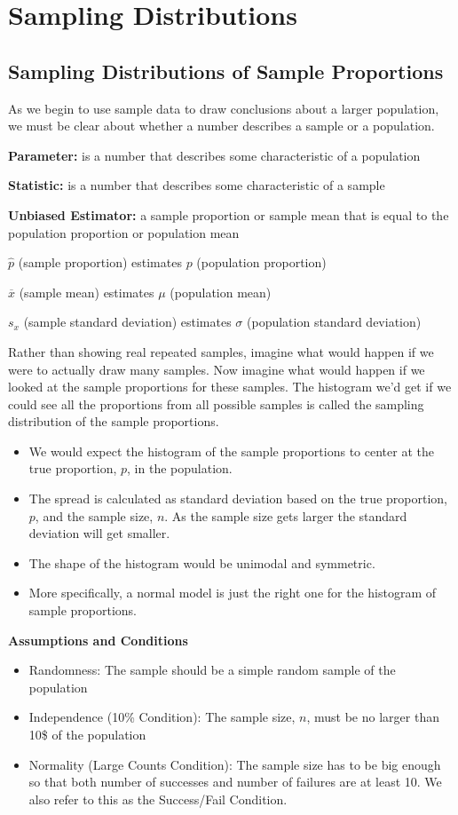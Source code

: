 \documentclass[../stats.tex]{subfiles}
\begin{document}
\chapter{Sampling Distributions}
\section{Sampling Distributions of Sample Proportions}
As we begin to use sample data to draw conclusions about a larger population, we must be clear about whether a number describes a sample or a population.

\textbf{Parameter: } is a number that describes some characteristic of a population 

\textbf{Statistic: } is a number that describes some characteristic of a sample 

\textbf{Unbiased Estimator: } a sample proportion or sample mean that is equal to the population proportion or population mean 

$\hat{p}$ (sample proportion) estimates $p$ (population proportion)

$\overline{x}$ (sample mean) estimates $\mu$ (population mean)

$s_x$ (sample standard deviation) estimates $\sigma$ (population standard deviation)

Rather than showing real repeated samples, imagine what would happen if we were to actually draw many samples. Now imagine what would happen if 
we looked at the sample proportions for these samples. The histogram we'd get if we could see all the proportions from all possible samples is called the 
sampling distribution of the sample proportions.
\begin{itemize}
    \item We would expect the histogram of the sample proportions to center at the true proportion, $p$, in the population.
    \item The spread is calculated as standard deviation based on the true proportion, $p$, and the sample size, $n$. As the sample size gets larger the standard deviation will get smaller.
    \item The shape of the histogram would be unimodal and symmetric.
    \item More specifically, a normal model is just the right one for the histogram of sample proportions.
\end{itemize}

\textbf{Assumptions and Conditions}
\begin{itemize}
    \item Randomness: The sample should be a simple random sample of the population 
    \item Independence (10\% Condition): The sample size, $n$, must be no larger than 10\$ of the population 
    \item Normality (Large Counts Condition): The sample size has to be big enough so that both number of successes and number of failures are at least 10. We also refer to this as the Success/Fail Condition.
\end{itemize}
\end{document}
